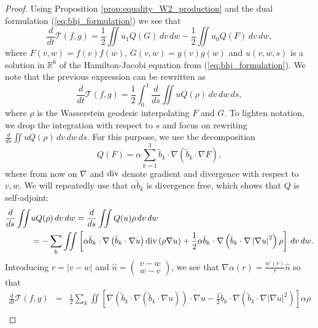 \documentclass[11pt]{amsart}
\numberwithin{equation}{section}
\begin{document}
\begin{proof}

Using Proposition \ref{prop:equality_W2_production} and the dual formulation (\ref{eq:bhj_formulation}) we see that 
%
\begin{equation*}
  \frac{d}{dt}\mathcal{T}(f,g)=\frac{1}{2}\iint u_{1}Q(G)\,dv\,dw-\frac{1}{2}\iint u_{0}Q(F)\,dv\,dw,
\end{equation*}
%
where $F(v,w)=f(v)f(w)$, $G(v,w)=g(v)g(w)$ and $u(v,w,s)$ is a solution in $\mathbb{R}^6$ of the Hamilton-Jacobi equation from (\ref{eq:bhj_formulation}). We note that the previous expression can be rewritten as
%
\begin{equation*}
  \frac{d}{dt}\mathcal{T}(f,g)=\frac{1}{2}\int_{0}^{1}\frac{d}{ds}\iint u Q(\rho)\,dv\,dw\,ds,
\end{equation*}
%
where  $\rho$ is the Wasserstein geodesic interpolating $F$ and $G$.  To lighten notation, we drop the integration with respect to $s$ and focus on rewriting $\frac{d}{ds}\iint uQ(\rho)\,dv\,dw\,ds$. For this purpose, we use the decomposition
%
\begin{equation*}
  Q(F)=\alpha\sum_{k=1}^{3}\tilde{b}_{k}\cdot\nabla\left(\tilde b_{k}\cdot\nabla F\right),
\end{equation*}
%
where from now on $\nabla$ and $\textnormal{div}$ denote gradient and divergence with respect to $v,w$. We will repeatedly use that $\alpha \tilde b_k$ is divergence free, which shows that $Q$ is self-adjoint:
% 
\begin{align*}
  \frac{d}{ds}\iint & uQ(\rho)  \,dv\,dw =\frac{d}{ds}\iint Q(u)\rho\,dv\,dw\\
  & =-\sum_{k}\iint\left[\alpha\tilde{b}_{k}\cdot\nabla\left(\tilde{b}_{k}\cdot\nabla u\right)\textnormal{div}\left(\rho\nabla u\right)+\frac{1}{2}\alpha\tilde{b}_{k}\cdot\nabla\left(\tilde{b}_{k}\cdot\nabla\left|\nabla u\right|^{2}\right)\rho\right]\,dv\,dw.
\end{align*}
% 
Introducing $r=\left|v-w\right|$ and $\hat n = \begin{pmatrix}v-w\\w-v\end{pmatrix}$, we see that $\nabla \alpha(r) = \frac{\alpha'(r)}{r}\hat n$ so that
% 
\begin{eqnarray}
  \frac{d}{dt}\mathcal{T}(f,g)&=&\frac{1}{2}\sum_{k}\iint\left[\nabla\left(\tilde{b}_{k}\cdot\nabla\left(\tilde{b}_{k}\cdot\nabla u\right)\right)\cdot\nabla u-\frac{1}{2}\tilde{b}_{k}\cdot\nabla\left(\tilde{b}_{k}\cdot\nabla\left|\nabla u\right|^{2}\right)\right]\alpha\rho\nonumber	\\

\end{eqnarray}
\end{proof}
\end{document}
